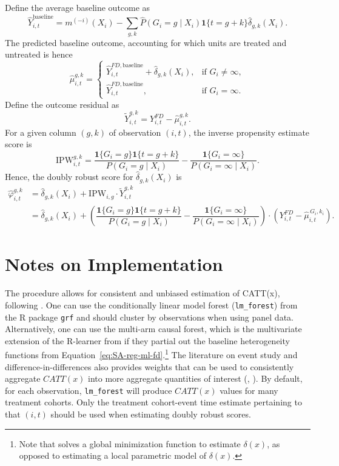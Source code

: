 \documentclass[12pt,notitlepage]{article}
\renewcommand{\eqref}[1]{Equation~\ref{#1}}
\begin{document}
Define the average baseline outcome as
$$\widehat Y_{i,t}^{\mathrm{baseline}} = m^{(-i)}(X_i) - \sum_{g,k} \widehat P(G_i = g \mid X_i) \mathbf{1}\{t=g+k\} \widehat\delta_{g,k}(X_i).$$
The predicted baseline outcome, accounting for which units are treated and untreated is hence
\[
\widehat\mu_{i,t}^{g, k} =
\begin{cases}
\widehat Y_{i,t}^{FD,\mathrm{baseline}} + \widehat\delta_{g,k}(X_i), & \text{if } G_i \neq \infty, \\[6pt]
\widehat Y_{i,t}^{FD,\mathrm{baseline}}, & \text{if } G_i = \infty.
\end{cases}
\]
Define the outcome residual as 
$$\widetilde{Y}_{i,t}^{g,k} = Y_{i,t}^{FD} - \widehat\mu_{i,t}^{g, k}.$$
For a given column $(g, k)$ of observation $(i, t)$, the inverse propensity estimate score is
$$\mathrm{IPW}_{i,t}^{g, k} = \dfrac{\mathbf{1}\{G_i=g\} \mathbf{1}\{t=g+k\}}{ P(G_i = g \mid X_i) }- \dfrac{\mathbf{1}\{G_i=\infty\}}{ P(G_i = \infty \mid X_i) }. $$
Hence, the doubly robust score for $\hat{\delta}_{g, k}(X_i)$ is 
\begin{align*}
\widehat\varphi_{i,t}^{g, k} &= \widehat \delta_{g,k}(X_i) + \mathrm{IPW}_{i,g} \cdot \widetilde{Y}_{i,t}^{g,k} \\ 
&= \widehat \delta_{g,k}(X_i)
  + \left( \dfrac{\mathbf{1}\{G_i=g\} \mathbf{1}\{t=g+k\}}{ P(G_i = g \mid X_i) }
  - \dfrac{\mathbf{1}\{G_i=\infty\}}{ P(G_i = \infty \mid X_i) } \right) \cdot \left( Y_{i,t}^{FD}  - \widehat\mu_{i,t}^{\,G_i,k_i} \right) .
\end{align*}



\section{Notes on Implementation}
The procedure allows for consistent and unbiased estimation of CATT(x), following \citealt{athey_generalized_2019}. 
One can use the conditionally linear model forest (\texttt{lm\_forest}) from the R package \texttt{grf} and should cluster by observations when using panel data. 
Alternatively, one can use the multi-arm causal forest, which is the multivariate extension of the R-learner from \citealt{nie_quasi-oracle_2021} if they partial out the baseline heterogeneity functions from \eqref{eq:SA-reg-ml-fd}.\footnote{Note that \citealt{nie_quasi-oracle_2021} solves a global minimization function to estimate $\delta(x)$, as opposed to estimating a local parametric model of $\delta(x)$.}
The literature on event study and difference-in-differences also  provides weights that can be used to consistently aggregate $CATT(x)$ into more aggregate quantities of interest (\citealt{callaway_difference--differences_2021}, \citealt{sun_estimating_2021}).
By default, for each observation, \texttt{lm\_forest} will produce $CATT(x)$ values for many treatment cohorts. 
Only the treatment cohort-event time estimate pertaining to that $(i, t)$ should be used when estimating doubly robust scores. 
\end{document}
